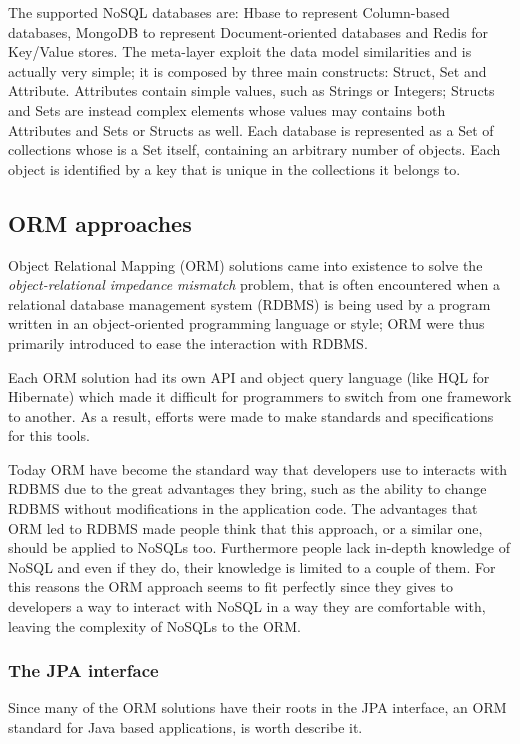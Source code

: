 \noindent The supported NoSQL databases are: Hbase to represent Column-based databases, MongoDB to represent Document-oriented databases and Redis for Key/Value stores. 
\noindent The meta-layer exploit the data model similarities and is actually very simple; it is composed by three main constructs: Struct, Set and Attribute.
Attributes contain simple values, such as Strings or Integers; Structs and Sets are instead complex elements whose values may contains both Attributes and Sets or Structs as well.
Each database is represented as a Set of collections whose is a Set itself, containing an arbitrary number of objects. Each object is identified by a key that is unique in the collections it belongs to.

\subsection{ORM approaches}
Object Relational Mapping (ORM) solutions came into existence to solve the  \textit{object-relational impedance mismatch} problem, that is often encountered when a relational database management system (RDBMS) is being used by a program written in an object-oriented programming language or style; ORM were thus primarily introduced to ease the interaction with RDBMS.

\noindent Each ORM solution had its own API and object query language (like HQL for Hibernate) which made it difficult for programmers to switch from one framework to another. As a result, efforts were made to make standards and specifications for this tools. 

\noindent Today ORM have become the standard way that developers use to interacts with RDBMS due to the great advantages they bring, such as the ability to change RDBMS without modifications in the application code.
The advantages that ORM led to RDBMS made people think that this approach, or a similar one, should be applied to NoSQLs too. 
Furthermore people lack in-depth knowledge of NoSQL and even if they do, their knowledge is limited to a couple of them. For this reasons the ORM approach seems to fit perfectly since they gives to developers a way to interact with NoSQL in a way they are comfortable with, leaving the complexity of NoSQLs to the ORM.

\subsubsection{The JPA interface}
\label{sec:jpa}
Since many of the ORM solutions have their roots in the JPA interface, an ORM standard for Java based applications, is worth describe it.

